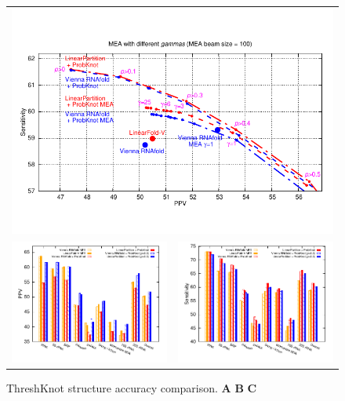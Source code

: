 \iffalse
\begin{figure}[H]
\center
\begin{tabular}{cc}
\multicolumn{2}{c}{\hspace{-1cm}\includegraphics[scale=.7]{figs/MEA_gamma_B100}}
\\
\hspace{-0.5cm}\includegraphics[scale=.68]{figs/ProbKnot_PPV}
&\hspace{-0.5cm}\includegraphics[scale=.68]{figs/ProbKnot_Sens}
\end{tabular}
\caption{ThreshKnot structure accuracy comparison.
	{\bf A}
	{\bf B}
	{\bf C}
	\label{probknot}
}
\end{figure}
